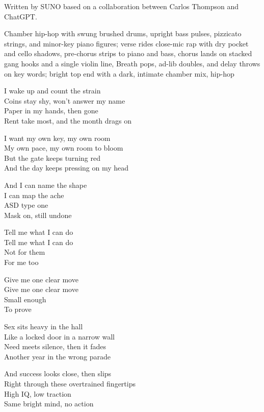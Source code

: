 
\begin{notes}
Written by SUNO based on a collaboration between Carlos Thompson and ChatGPT.
\end{notes}
\begin{style}
Chamber hip-hop with swung brushed drums, upright bass pulses, pizzicato strings, and minor-key piano figures; verse rides close-mic rap with dry pocket and cello shadows, pre-chorus strips to piano and bass, chorus lands on stacked gang hooks and a single violin line, Breath pops, ad-lib doubles, and delay throws on key words; bright top end with a dark, intimate chamber mix, hip-hop
\end{style}
\begin{lyrics}
I wake up and count the strain\\
Coins stay shy, won't answer my name\\
Paper in my hands, then gone\\
Rent take most, and the month drags on

I want my own key, my own room\\
My own pace, my own room to bloom\\
But the gate keeps turning red\\
And the day keeps pressing on my head

And I can name the shape\\
I can map the ache\\
ASD type one\\
Mask on, still undone

Tell me what I can do\\
Tell me what I can do\\
Not for them\\
For me too

Give me one clear move\\
Give me one clear move\\
Small enough\\
To prove

Sex sits heavy in the hall\\
Like a locked door in a narrow wall\\
Need meets silence, then it fades\\
Another year in the wrong parade

And success looks close, then slips\\
Right through these overtrained fingertips\\
High IQ, low traction\\
Same bright mind, no action


\end{lyrics}

